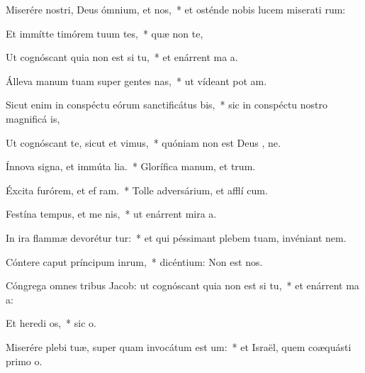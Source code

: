 \item Miserére nostri, Deus ómnium, et  nos,~* et osténde nobis lucem miserati rum:
\item Et immítte timórem tuum  tes,~* quæ non  te,
\item Ut cognóscant quia non est  si tu,~* et enárrent ma a.
\item Álleva manum tuam super gentes nas,~* ut vídeant pot am.
\item Sicut enim in conspéctu eórum sanctificátus   bis,~* sic in conspéctu nostro magnificá  is,
\item Ut cognóscant te, sicut et  vimus,~* quóniam non est Deus  , ne.
\item Ínnova signa, et immúta lia.~* Glorífica manum, et  trum.
\item Éxcita furórem, et ef ram.~* Tolle adversárium, et afflí cum.
\item Festína tempus, et me nis,~* ut enárrent mira a.
\item In ira flammæ devorétur  tur:~* et qui péssimant plebem tuam, invéniant nem.
\item Cóntere caput príncipum inrum,~* dicéntium: Non est   nos.
\item Cóngrega omnes tribus Jacob: ut cognóscant quia non est  si tu,~* et enárrent ma a:
\item Et heredi os,~* sic  o.
\item Miserére plebi tuæ, super quam invocátum est  um:~* et Israël, quem coæquásti primo o.
